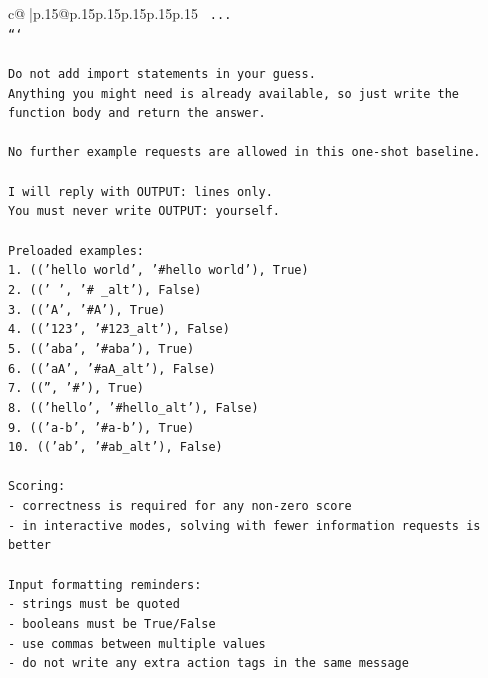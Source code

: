 \documentclass{article}
\begin{document}
{\begin{supertabular}{c@{$\;$}|p{.15\linewidth}@{}p{.15\linewidth}p{.15\linewidth}p{.15\linewidth}p{.15\linewidth}p{.15\linewidth}}
{{{\texttt{    ...} \\
\texttt{```} \\
\\ 
\texttt{Do not add import statements in your guess.} \\
\texttt{Anything you might need is already available, so just write the function body and return the answer.} \\
\\ 
\texttt{No further example requests are allowed in this one{-}shot baseline.} \\
\\ 
\texttt{I will reply with OUTPUT: lines only.} \\
\texttt{You must never write OUTPUT: yourself.} \\
\\ 
\texttt{Preloaded examples:} \\
\texttt{1. (('hello world', '\#hello world'), True)} \\
\texttt{2. ((' ', '\# \_alt'), False)} \\
\texttt{3. (('A', '\#A'), True)} \\
\texttt{4. (('123', '\#123\_alt'), False)} \\
\texttt{5. (('aba', '\#aba'), True)} \\
\texttt{6. (('aA', '\#aA\_alt'), False)} \\
\texttt{7. (('', '\#'), True)} \\
\texttt{8. (('hello', '\#hello\_alt'), False)} \\
\texttt{9. (('a{-}b', '\#a{-}b'), True)} \\
\texttt{10. (('ab', '\#ab\_alt'), False)} \\
\\ 
\texttt{Scoring:} \\
\texttt{{-} correctness is required for any non{-}zero score} \\
\texttt{{-} in interactive modes, solving with fewer information requests is better} \\
\\ 
\texttt{Input formatting reminders:} \\
\texttt{{-} strings must be quoted} \\
\texttt{{-} booleans must be True/False} \\
\texttt{{-} use commas between multiple values} \\
\texttt{{-} do not write any extra action tags in the same message} \\
\\ 
}}}
\end{supertabular}}
\end{document}
